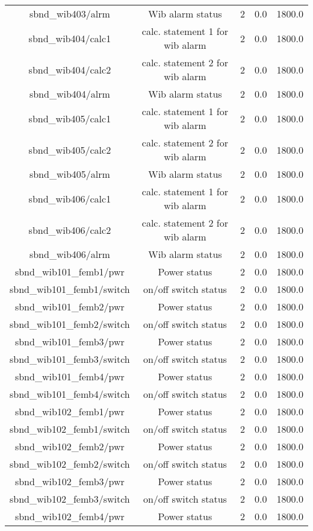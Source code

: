 \begin{center}
\begin{longtable}{c | c c c c }
sbnd\_wib403/alrm & Wib alarm status & 2 & 0.0 & 1800.0\\ 
sbnd\_wib404/calc1 & calc. statement 1 for wib alarm & 2 & 0.0 & 1800.0\\ 
sbnd\_wib404/calc2 & calc. statement 2 for wib alarm & 2 & 0.0 & 1800.0\\ 
sbnd\_wib404/alrm & Wib alarm status & 2 & 0.0 & 1800.0\\ 
sbnd\_wib405/calc1 & calc. statement 1 for wib alarm & 2 & 0.0 & 1800.0\\ 
sbnd\_wib405/calc2 & calc. statement 2 for wib alarm & 2 & 0.0 & 1800.0\\ 
sbnd\_wib405/alrm & Wib alarm status & 2 & 0.0 & 1800.0\\ 
sbnd\_wib406/calc1 & calc. statement 1 for wib alarm & 2 & 0.0 & 1800.0\\ 
sbnd\_wib406/calc2 & calc. statement 2 for wib alarm & 2 & 0.0 & 1800.0\\ 
sbnd\_wib406/alrm & Wib alarm status & 2 & 0.0 & 1800.0\\ 
sbnd\_wib101\_femb1/pwr & Power status & 2 & 0.0 & 1800.0\\ 
sbnd\_wib101\_femb1/switch & on/off switch status & 2 & 0.0 & 1800.0\\ 
sbnd\_wib101\_femb2/pwr & Power status & 2 & 0.0 & 1800.0\\ 
sbnd\_wib101\_femb2/switch & on/off switch status & 2 & 0.0 & 1800.0\\ 
sbnd\_wib101\_femb3/pwr & Power status & 2 & 0.0 & 1800.0\\ 
sbnd\_wib101\_femb3/switch & on/off switch status & 2 & 0.0 & 1800.0\\ 
sbnd\_wib101\_femb4/pwr & Power status & 2 & 0.0 & 1800.0\\ 
sbnd\_wib101\_femb4/switch & on/off switch status & 2 & 0.0 & 1800.0\\ 
sbnd\_wib102\_femb1/pwr & Power status & 2 & 0.0 & 1800.0\\ 
sbnd\_wib102\_femb1/switch & on/off switch status & 2 & 0.0 & 1800.0\\ 
sbnd\_wib102\_femb2/pwr & Power status & 2 & 0.0 & 1800.0\\ 
sbnd\_wib102\_femb2/switch & on/off switch status & 2 & 0.0 & 1800.0\\ 
sbnd\_wib102\_femb3/pwr & Power status & 2 & 0.0 & 1800.0\\ 
sbnd\_wib102\_femb3/switch & on/off switch status & 2 & 0.0 & 1800.0\\ 
sbnd\_wib102\_femb4/pwr & Power status & 2 & 0.0 & 1800.0\\ 

\end{longtable}
\end{center}

